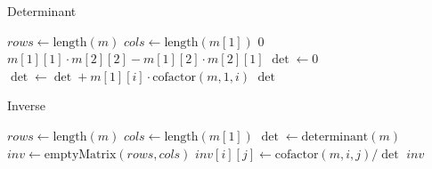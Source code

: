 \begin{algorithm}
    \caption{Determinant}
    \begin{algorithmic}
            \State $rows \gets \text{length}(m)$
            \State $cols \gets \text{length}(m[1])$
                \State \Return $0$
            \EndIf
                \State \Return $m[1][1] \cdot m[2][2] - m[1][2] \cdot m[2][1]$
            \EndIf
            \State $\det \gets 0$
                \State $\det \gets \det + m[1][i] \cdot \text{cofactor}(m, 1, i)$
            \EndFor
            \State \Return $\det$
        \EndFunction
    \end{algorithmic}\label{alg:algorithm9}
\end{algorithm}

\begin{algorithm}
    \caption{Inverse}
    \begin{algorithmic}
            \State $rows \gets \text{length}(m)$
            \State $cols \gets \text{length}(m[1])$
            \State $\det \gets \text{determinant}(m)$
                \State \Return {}
            \EndIf
            \State $inv \gets \text{emptyMatrix}(rows, cols)$
                    \State $inv[i][j] \gets \text{cofactor}(m, i, j) / \det$
                \EndFor
            \EndFor
            \State \Return $inv$
        \EndFunction
    \end{algorithmic}\label{alg:algorithm10}
\end{algorithm}